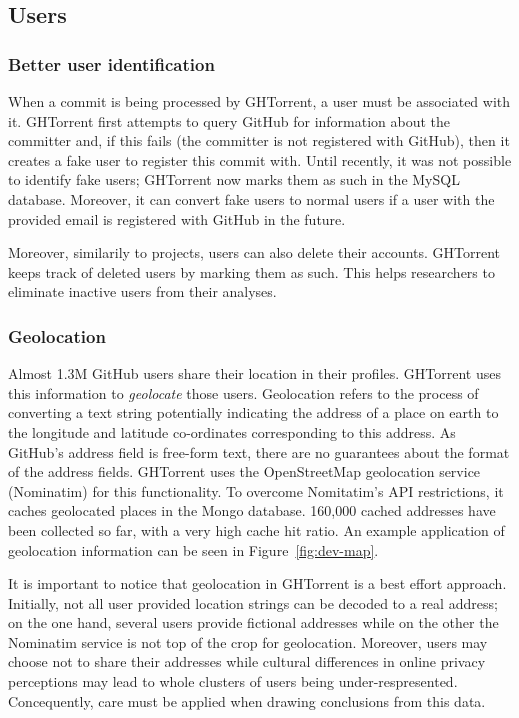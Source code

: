 \documentclass{sig-alternate}
\begin{document}
\subsection{Users}
\subsubsection{Better user identification}

When a commit is being processed by GHTorrent, a user must be associated with it.
GHTorrent first attempts to query GitHub for information about the committer
and, if this fails (the committer is not registered with GitHub), then it
creates a fake user to register this commit with. Until recently, it was not
possible to identify fake users; GHTorrent now marks them as such in the MySQL
database. Moreover, it can convert fake users to normal users if a user with
the provided email is registered with GitHub in the future.

Moreover, similarily to projects, users can also delete their accounts.
GHTorrent keeps track of deleted users by marking them as such. This helps
researchers to eliminate inactive users from their analyses.

\subsubsection{Geolocation}

Almost 1.3M GitHub users share their location in their profiles. GHTorrent uses
this information to \emph{geolocate} those users. Geolocation refers to the
process of converting a text string potentially indicating the address of a
place on earth to the longitude and latitude co-ordinates corresponding to this
address. As GitHub's address field is free-form text, there are no guarantees
about the format of the address fields. GHTorrent uses the OpenStreetMap
geolocation service (Nominatim) for this functionality. To overcome Nomitatim's
API restrictions, it caches geolocated places in the Mongo database. 160,000
cached addresses have been collected so far, with a very high cache hit ratio.
An example application of geolocation information can be seen in
Figure~\ref{fig:dev-map}.

It is important to notice that geolocation in GHTorrent is a best effort
approach. Initially, not all user provided location strings can be decoded to a
real address; on the one hand, several users provide fictional addresses while
on the other the Nominatim service is not top of the crop for geolocation.
Moreover, users may choose not to share their addresses while cultural
differences in online privacy perceptions may lead to whole clusters of users
being under-respresented. Concequently, care must be applied when drawing
conclusions from this data.
\end{document}
